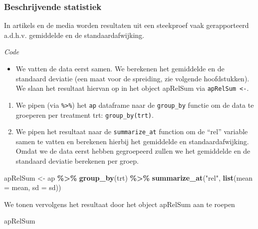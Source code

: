 \documentclass[
  12pt,dutch,coursenotes]{book}
\newenvironment{Shaded}{\begin{snugshade}}{\end{snugshade}}
\newcommand{\DataTypeTok}[1]{\textcolor[rgb]{0.13,0.29,0.53}{#1}}
\newcommand{\KeywordTok}[1]{\textcolor[rgb]{0.13,0.29,0.53}{\textbf{#1}}}
\newcommand{\NormalTok}[1]{#1}
\newcommand{\OperatorTok}[1]{\textcolor[rgb]{0.81,0.36,0.00}{\textbf{#1}}}
\newcommand{\StringTok}[1]{\textcolor[rgb]{0.31,0.60,0.02}{#1}}
\providecommand{\tightlist}{%
  \setlength{\itemsep}{0pt}\setlength{\parskip}{0pt}}
\theoremstyle{definition}
\theoremstyle{definition}
\theoremstyle{definition}
\theoremstyle{remark}
\begin{document}
\hypertarget{beschrijvende-statistiek}{%
\subsubsection{Beschrijvende statistiek}\label{beschrijvende-statistiek}}

In artikels en de media worden resultaten uit een steekproef vaak gerapporteerd a.d.h.v. gemiddelde en de standaardafwijking.

\emph{Code}

\begin{itemize}
\tightlist
\item
  We vatten de data eerst samen. We berekenen het gemiddelde en de standaard deviatie (een maat voor de spreiding, zie volgende hoofdstukken).
  We slaan het resultaat hiervan op in het object apRelSum via \texttt{apRelSum\ \textless{}-}.
\end{itemize}

\begin{enumerate}
\def\labelenumi{\arabic{enumi}.}
\item
  We pipen (via \texttt{\%\textgreater{}\%}) het \texttt{ap} dataframe naar de \texttt{group\_by} functie om de data te groeperen per treatment trt: \texttt{group\_by(trt)}.
\item
  We pipen het resultaat naar de \texttt{summarize\_at} function om de ``rel'' variable samen te vatten en berekenen hierbij het gemiddelde en standaardafwijking. Omdat we de data eerst hebben gegroepeerd zullen we het gemiddelde en de standaard deviatie berekenen per groep.
\end{enumerate}

\begin{Shaded}
\begin{Highlighting}[]
\NormalTok{apRelSum \textless{}{-}}\StringTok{ }\NormalTok{ap }\OperatorTok{\%\textgreater{}\%}\StringTok{ }\KeywordTok{group\_by}\NormalTok{(trt) }\OperatorTok{\%\textgreater{}\%}\StringTok{ }\KeywordTok{summarize\_at}\NormalTok{(}\StringTok{"rel"}\NormalTok{, }
    \KeywordTok{list}\NormalTok{(}\DataTypeTok{mean =}\NormalTok{ mean, }\DataTypeTok{sd =}\NormalTok{ sd))}
\end{Highlighting}
\end{Shaded}

We tonen vervolgens het resultaat door het object apRelSum aan te roepen

\begin{Shaded}
\begin{Highlighting}[]
\NormalTok{apRelSum}
\end{Highlighting}
\end{Shaded}
\end{document}
